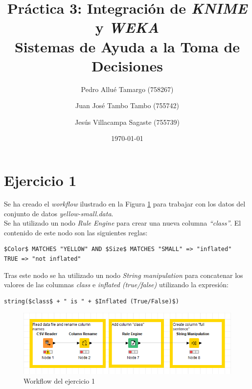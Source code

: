 \documentclass[10pt,a4paper]{article}
\begin{document}
\begin{titlepage}
\title{\textbf{
	{\Huge Práctica 3: Integración de \emph{KNIME} y \emph{WEKA}}\\
	{\Large Sistemas de Ayuda a la Toma de Decisiones}
}}
\author{
	Pedro Allué Tamargo (758267)
	\and
	Juan José Tambo Tambo (755742)
	\and
	Jesús Villacampa Sagaste (755739)
}
\date{\today}
\clearpage\maketitle
\thispagestyle{empty}
\end{titlepage}

\tableofcontents

\newpage
\section{Ejercicio 1}

Se ha creado el \emph{workflow} ilustrado en la Figura \ref{fig:workflow_ej1} para trabajar con los datos del conjunto de datos \emph{yellow-small.data}.\\
Se ha utilizado un nodo \emph{Rule Engine} para crear una nueva columna \emph{``class''}. El contenido de este nodo son las siguientes reglas:

\begin{lstlisting}
$Color$ MATCHES "YELLOW" AND $Size$ MATCHES "SMALL" => "inflated"
TRUE => "not inflated"
\end{lstlisting}

Tras este nodo se ha utilizado un nodo \emph{String manipulation} para concatenar los valores de las columnas \emph{class} e \emph{inflated (true/false)} utilizando la expresión:

\begin{lstlisting}
string($class$ + " is " + $Inflated (True/False)$)
\end{lstlisting}

\begin{figure}[h!]
	\centering
	\includegraphics[scale=0.5]{images/workflow_ej1.png}
	\caption{Workflow del ejercicio 1}
	\label{fig:workflow_ej1}
\end{figure}
\end{document}
